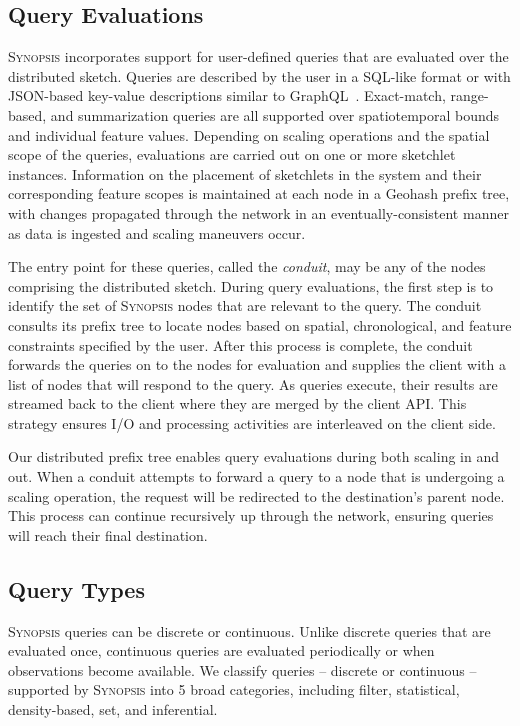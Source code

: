 \subsection{Query Evaluations}
\label{subsec:query-eval}
\textsc{Synopsis} incorporates support for user-defined queries that are evaluated over the distributed sketch.  Queries are described by the user in a SQL-like format or with JSON-based key-value descriptions similar to GraphQL~\cite{graphql}. Exact-match, range-based, and summarization queries are all supported over spatiotemporal bounds and individual feature values. Depending on scaling operations and the spatial scope of the queries, evaluations are carried out on one or more sketchlet instances. Information on the placement of sketchlets in the system and their corresponding feature scopes is maintained at each node in a Geohash prefix tree, with changes propagated through the network in an eventually-consistent manner as data is ingested and scaling maneuvers occur.

The entry point for these queries, called the \emph{conduit}, may be any of the nodes comprising the distributed sketch. During query evaluations, the first step is to identify the set of \textsc{Synopsis} nodes that are relevant to the query. The conduit consults its prefix tree to locate nodes based on spatial, chronological, and feature constraints specified by the user. After this process is complete, the conduit forwards the queries on to the nodes for evaluation and supplies the client with a list of nodes that will respond to the query. As queries execute, their results are streamed back to the client where they are merged by the client API. This strategy ensures I/O and processing activities are interleaved on the client side.

Our distributed prefix tree enables query evaluations during both scaling in and out. When a conduit attempts to forward a query to a node that is undergoing a scaling operation, the request will be redirected to the destination's parent node. This process can continue recursively up through the network, ensuring queries will reach their final destination.

\subsection{Query Types}
\textsc{Synopsis} queries can be discrete or continuous. Unlike discrete queries that are evaluated once, continuous queries are evaluated periodically or when observations become available. We classify queries -- discrete or continuous -- supported by \textsc{Synopsis} into 5 broad categories, including filter, statistical, density-based, set, and inferential.

